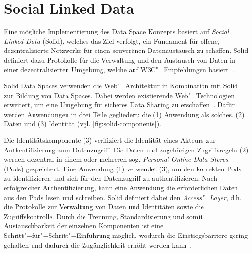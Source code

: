 
\section{Social Linked Data}

Eine mögliche Implementierung des Data Space Konzepts basiert auf \emph{Social Linked Data} (Solid), welches das Ziel verfolgt, ein Fundament für offene, dezentralisierte Netzwerke für einen souveränen Datenaustausch zu schaffen.
Solid definiert dazu Protokolle für die Verwaltung und den Austausch von Daten in einer dezentralisierten Umgebung, welche auf W3C"=Empfehlungen basiert~\cite{mecklerWebLinkedData2023}.




Solid Data Spaces verwenden die Web"=Architektur in Kombination mit Solid zur Bildung von Data Spaces.
Dabei werden existierende Web"=Technologien erweitert, um eine Umgebung für sicheres Data Sharing zu erschaffen~\cite{mecklerWebLinkedData2023}.
Dafür werden Anwendungen in drei Teile gegliedert: die (1) Anwendung als solches, (2) Daten und (3) Identität (vgl. \autoref{fig:solid-components}).

Die Identitätskomponente (3) verifiziert die Identität eines Akteurs zur Authentifizierung zum Datenzugriff.
Die Daten und zugehörigen Zugriffsregeln (2) werden dezentral in einem oder mehreren sog. \emph{Personal Online Data Stores} (Pods) gespeichert.
Eine Anwendung (1) verwendet (3), um den korrekten Pods zu identifizieren und sich für den Datenzugriff zu authentifizieren.
Nach erfolgreicher Authentifizierung, kann eine Anwendung die erforderlichen Daten aus den Pods lesen und schreiben.
Solid definiert dabei den \emph{Access"=Layer}, d.h. die Protokolle zur Verwaltung von Daten und Identitäten sowie die Zugriffskontrolle.
Durch die Trennung, Standardisierung und somit Austauschbarkeit der einzelnen Komponenten ist eine Schritt"=für"=Schritt"=Einführung möglich, wodurch die Einstiegsbarriere gering gehalten und dadurch die Zugänglichkeit erhöht werden kann~\cite{mecklerWebLinkedData2023}.

